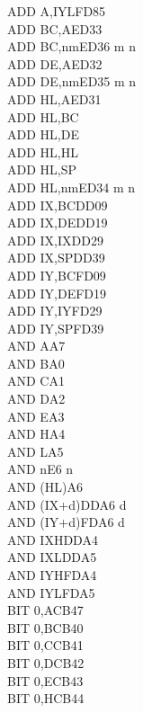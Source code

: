 \begin{multicols}{3}
{\begin{tabbing}
        ADD A,IYL\UNDOC\>FD85\\
        ADD BC,A\ZXN\>ED33\\
        ADD BC,nm\ZXN\>ED36	m n\\
        ADD DE,A\ZXN\>ED32\\
        ADD DE,nm\ZXN\>ED35 m n\\
        ADD HL,A\ZXN\>ED31\\
        ADD HL,BC\\
        ADD HL,DE\\
        ADD HL,HL\\
        ADD HL,SP\\
        ADD HL,nm\ZXN\>ED34 m n\\
        ADD IX,BC\>DD09\\
        ADD IX,DE\>DD19\\
        ADD IX,IX\>DD29\\
        ADD IX,SP\>DD39\\
        ADD IY,BC\>FD09\\
        ADD IY,DE\>FD19\\
        ADD IY,IY\>FD29\\
        ADD IY,SP\>FD39\\
        AND A\>A7\\
        AND B\>A0\\
        AND C\>A1\\
        AND D\>A2\\
        AND E\>A3\\
        AND H\>A4\\
        AND L\>A5\\
        AND n\>E6 n\\
        AND (HL)\>A6\\
        AND (IX+d)\>DDA6 d\\
        AND (IY+d)\>FDA6 d\\
        AND IXH\UNDOC\>DDA4\\
        AND IXL\UNDOC\>DDA5\\
        AND IYH\UNDOC\>FDA4\\
        AND IYL\UNDOC\>FDA5\\
        BIT 0,A\>CB47\\
        BIT 0,B\>CB40\\
        BIT 0,C\>CB41\\
        BIT 0,D\>CB42\\
        BIT 0,E\>CB43\\
        BIT 0,H\>CB44\\

\end{tabbing}}
\end{multicols}
